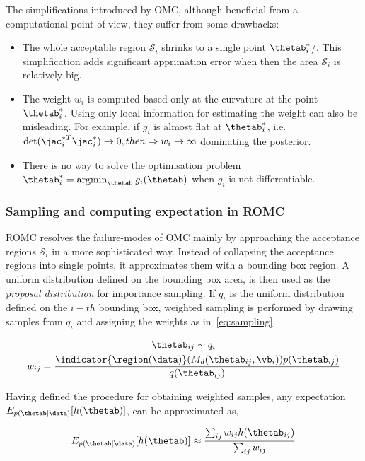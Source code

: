 The simplifications introduced by OMC, although beneficial from a
computational point-of-view, they suffer from some drawbacks:

\begin{itemize}
\item The whole acceptable region $\mathcal{S}_i$
  shrinks to a single point $\thetab_i^*$/. This simplification adds
  significant apprimation error when then the area $\mathcal{S}_i$ is relatively big.
\item The weight $w_i$ is computed based only at the curvature at the
  point $\thetab_i^*$. Using only local information for estimating the weight can also be misleading. For example, if $g_i$ is almost flat at $\thetab_i^*$, i.e. $\text{det}(\jac_i^{*T}\jac_i^*) \rightarrow 0, then \Rightarrow w_i
  \rightarrow \infty$ dominating the posterior.
\item There is no way to solve the optimisation problem
  $\thetab_i^* = \text{argmin}_{\thetab} \: g_i(\thetab)$ when $g_i$
  is not differentiable.
\end{itemize}

\subsubsection{Sampling and computing expectation in ROMC}

ROMC resolves the failure-modes of OMC mainly by approaching the
acceptance regions $\mathcal{S}_i$ in a more sophisticated
way. Instead of collapsing the acceptance regions into single points,
it approximates them with a bounding box region. A uniform distribution
defined on the bounding box area, is then used as the \emph{proposal
  distribution} for importance sampling. If $q_i$ is the uniform
distribution defined on the $i-th$ bounding box, weighted sampling is
performed by drawing samples from $q_i$ and assigning the weights as
in~\eqref{eq:sampling}.

\begin{gather}
  \thetab_{ij} \sim q_i \\  \label{eq:sampling}
  w_{ij} = \frac{\indicator{\region(\data)}(M_d(\thetab_{ij}, \vb_i)) p(\thetab_{ij})}{q(\thetab_{ij})}
\end{gather}

\noindent

Having defined the procedure for obtaining weighted samples, any
expectation $E_{p(\thetab|\data)}[h(\thetab)]$, can be approximated
as,

\begin{equation} \label{eq:expectation}
  E_{p(\thetab|\data)}[h(\thetab)] \approx \frac{\sum_{ij} w_{ij} h(\thetab_{ij})}{\sum_{ij} w_{ij}}
\end{equation}


